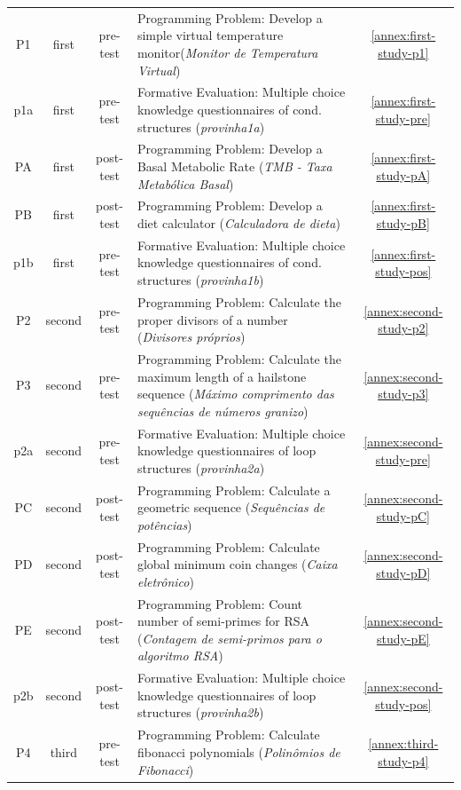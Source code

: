 {\begin{longtable}{cccp{9cm}c}
P1&first&pre-test&
Programming Problem: Develop a simple virtual temperature monitor(\emph{Monitor de Temperatura Virtual})&
\autoref{annex:first-study-p1}\tabularnewline

p1a&first&pre-test&
Formative Evaluation: Multiple choice knowledge questionnaires of cond. structures (\emph{provinha1a})&
\autoref{annex:first-study-pre}\tabularnewline


PA&first&post-test&
Programming Problem: Develop a Basal Metabolic Rate (\emph{TMB - Taxa Metabólica Basal})&
\autoref{annex:first-study-pA}\tabularnewline

PB&first&post-test&
Programming Problem: Develop a diet calculator (\emph{Calculadora de dieta})&
\autoref{annex:first-study-pB}\tabularnewline

p1b&first&pre-test&
Formative Evaluation: Multiple choice knowledge questionnaires of cond. structures (\emph{provinha1b})&
\autoref{annex:first-study-pos}\tabularnewline

P2&second&pre-test&
Programming Problem: Calculate the proper divisors of a number (\emph{Divisores próprios})&
\autoref{annex:second-study-p2}\tabularnewline

P3&second&pre-test&
Programming Problem: Calculate the maximum length of a hailstone sequence (\emph{Máximo comprimento das sequências de números granizo})&
\autoref{annex:second-study-p3}\tabularnewline

p2a&second&pre-test&
Formative Evaluation: Multiple choice knowledge questionnaires of loop structures (\emph{provinha2a})&
\autoref{annex:second-study-pre}\tabularnewline

PC&second&post-test&
Programming Problem: Calculate a geometric sequence (\emph{Sequências de potências})&
\autoref{annex:second-study-pC}\tabularnewline

PD&second&post-test&
Programming Problem: Calculate global minimum coin changes (\emph{Caixa eletrônico})&
\autoref{annex:second-study-pD}\tabularnewline

PE&second&post-test&
Programming Problem: Count number of semi-primes for RSA (\emph{Contagem de semi-primos para o algoritmo RSA})&
\autoref{annex:second-study-pE}\tabularnewline

p2b&second&post-test&
Formative Evaluation: Multiple choice knowledge questionnaires of loop structures (\emph{provinha2b})&
\autoref{annex:second-study-pos}\tabularnewline

P4&third&pre-test&
Programming Problem: Calculate fibonacci polynomials (\emph{Polinômios de Fibonacci})&
\autoref{annex:third-study-p4}\tabularnewline


\end{longtable}}
